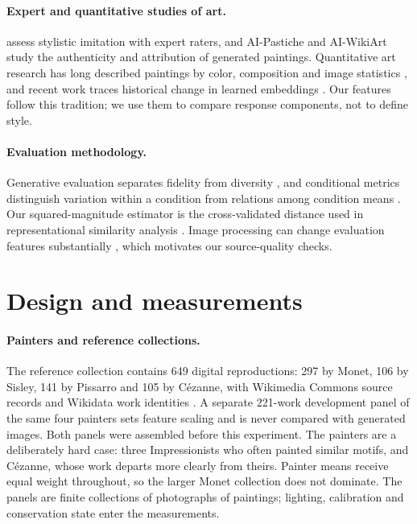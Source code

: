 \documentclass[10pt]{article}
\begin{document}
\paragraph{Expert and quantitative studies of art.}
\citet{deliege2025} assess stylistic imitation with expert raters, and
AI-Pastiche \citep{asperti2025pastiche} and AI-WikiArt \citep{fu2025aiwikiart}
study the authenticity and attribution of generated paintings. Quantitative art
research has long described paintings by color, composition and image statistics
\citep{kim2014,sigaki2018,lee2020}, and recent work traces historical change in
learned embeddings \citep{kim2026}. Our features follow this tradition; we use
them to compare response components, not to define style.

\paragraph{Evaluation methodology.}
Generative evaluation separates fidelity from diversity \citep{naeem2020}, and
conditional metrics distinguish variation within a condition from relations among
condition means \citep{benny2021conditional}. Our squared-magnitude estimator is
the cross-validated distance used in representational similarity analysis
\citep{diedrichsen2017representational}. Image processing can change evaluation
features substantially \citep{parmar2022}, which motivates our source-quality
checks.

\section{Design and measurements}\label{sec:design}

\paragraph{Painters and reference collections.}
The reference collection contains 649 digital reproductions: 297 by Monet, 106 by
Sisley, 141 by Pissarro and 105 by C\'ezanne, with Wikimedia Commons source records
and Wikidata work identities \citep{commonsglam,vrandecic2014wikidata}. A separate
221-work development panel of the same four painters sets feature scaling and is
never compared with generated images. Both panels were assembled before this
experiment. The painters are a deliberately hard case: three Impressionists who
often painted similar motifs, and C\'ezanne, whose work departs more clearly from
theirs. Painter means receive equal weight throughout, so the larger Monet
collection does not dominate. The panels are finite collections of photographs of
paintings; lighting, calibration and conservation state enter the measurements.
\end{document}
